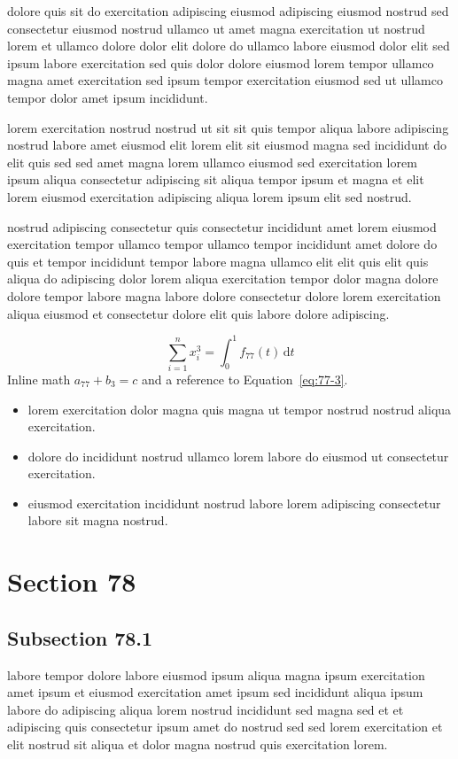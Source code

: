 \documentclass{article}
\begin{document}
dolore quis sit do exercitation adipiscing eiusmod adipiscing eiusmod nostrud sed consectetur eiusmod nostrud ullamco ut amet magna exercitation ut nostrud lorem et ullamco dolore dolor elit dolore do ullamco labore eiusmod dolor elit sed ipsum labore exercitation sed quis dolor dolore eiusmod lorem tempor ullamco magna amet exercitation sed ipsum tempor exercitation eiusmod sed ut ullamco tempor dolor amet ipsum incididunt.

lorem exercitation nostrud nostrud ut sit sit quis tempor aliqua labore adipiscing nostrud labore amet eiusmod elit lorem elit sit eiusmod magna sed incididunt do elit quis sed sed amet magna lorem ullamco eiusmod sed exercitation lorem ipsum aliqua consectetur adipiscing sit aliqua tempor ipsum et magna et elit lorem eiusmod exercitation adipiscing aliqua lorem ipsum elit sed nostrud.

nostrud adipiscing consectetur quis consectetur incididunt amet lorem eiusmod exercitation tempor ullamco tempor ullamco tempor incididunt amet dolore do quis et tempor incididunt tempor labore magna ullamco elit elit quis elit quis aliqua do adipiscing dolor lorem aliqua exercitation tempor dolor magna dolore dolore tempor labore magna labore dolore consectetur dolore lorem exercitation aliqua eiusmod et consectetur dolore elit quis labore dolore adipiscing.

\begin{equation}\label{eq:77-3}
  \sum_{i=1}^{n} x_i^{3} = \int_0^1 f_{77}(t)\,\mathrm{d}t
\end{equation}
Inline math $a_{77} + b_{3} = c$ and a reference to Equation~\eqref{eq:77-3}.

\begin{itemize}
  \item lorem exercitation dolor magna quis magna ut tempor nostrud nostrud aliqua exercitation.
  \item dolore do incididunt nostrud ullamco lorem labore do eiusmod ut consectetur exercitation.
  \item eiusmod exercitation incididunt nostrud labore lorem adipiscing consectetur labore sit magna nostrud.
\end{itemize}

\section{Section 78}\label{sec:78}
\subsection{Subsection 78.1}\label{sec:78-1}
labore tempor dolore labore eiusmod ipsum aliqua magna ipsum exercitation amet ipsum et eiusmod exercitation amet ipsum sed incididunt aliqua ipsum labore do adipiscing aliqua lorem nostrud incididunt sed magna sed et et adipiscing quis consectetur ipsum amet do nostrud sed sed lorem exercitation et elit nostrud sit aliqua et dolor magna nostrud quis exercitation lorem.
\end{document}

